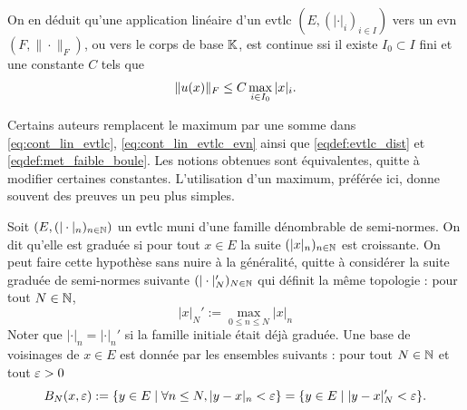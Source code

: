 On en déduit qu'une application linéaire d'un evtlc $(E,(|\cdot|_i)_{i \in I})$ vers un evn $(F,\|\cdot\|_F)$, ou vers le corps de base $\mathbb{K}$, est continue ssi il existe $I_0\subset I$ fini et une constante $C$ tels que 
\begin{equation}
\label{eq:cont_lin_evtlc_evn}
	\|u(x)\|_F \leq C \max_{i \in I_0} |x|_i. 
\leancheck{eq:cont_lin_evtlc_evn}%
\end{equation}

\begin{remark}
\label{rem:sommeMaxEvtlc}
%
	Certains auteurs remplacent le maximum par une somme dans \eqref{eq:cont_lin_evtlc}, \eqref{eq:cont_lin_evtlc_evn} ainsi que \eqref{eqdef:evtlc_dist} et \eqref{eqdef:met_faible_boule}. Les notions obtenues sont équivalentes, quitte à modifier certaines constantes. L'utilisation d'un maximum, préférée ici, donne souvent des preuves un peu plus simples. 
\end{remark}


\begin{remark}
\label{rem:evtlcGradue}
%
Soit $(E,(|\cdot|_n)_{n \in \mathbb{N}})$ un evtlc muni d'une famille dénombrable de semi-normes. On dit qu'elle est graduée si pour tout $x \in E$ la suite $(|x|_n)_{n \in \mathbb{N}}$ est croissante. 
On peut faire cette hypothèse sans nuire à la généralité, quitte à considérer la suite graduée de semi-normes suivante $(|\cdot|'_N)_{N \in \mathbb{N}}$ qui définit la même topologie : pour tout $N \in \mathbb{N}$,
\begin{equation*}
	|x|_N' := \max_{0 \leq n \leq N} |x|_n %
\end{equation*}
Noter que $|\cdot|_n = |\cdot|_n'$ si la famille initiale était déjà graduée. 
Une base de voisinages de $x\in E$ est donnée par les ensembles suivants : pour tout $N \in \mathbb{N}$ et tout $\varepsilon>0$
\begin{equation}
\label{eqdef:boule_graduee}
	B_N(x,\ve) :=  \{y \in E\mid \forall n \leq N, |y-x|_n < \ve\} = \{y \in E\mid |y-x|'_N < \ve\}.
\leancheck{eqdef:boule_graduee}%
\end{equation}

\end{remark}

